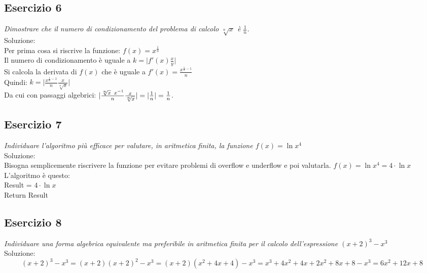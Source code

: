 \subsection{Esercizio 6}
\emph{Dimostrare che il numero di condizionamento del problema di calcolo $ \sqrt[n]{x} $ è $\frac{1}{n}$.\\}
Soluzione: \\
Per prima cosa si riscrive la funzione: $f(x) = x^{\frac{1}{n}}$\\
Il numero di condizionamento è uguale a $k = \lvert f'(x) \frac{x}{y} \rvert $\\ %
Si calcola la derivata di $ f(x) $ che è uguale a $ f'(x) = \frac{x^ { \frac{1}{n}-1 } }{n}$\\
Quindi: $ k = \lvert \frac{x^{\frac{1}{n}-1}}{n} \frac{x}{\sqrt[n]{x} }\rvert$ \\
Da cui con passaggi algebrici:
$\lvert \frac{\sqrt[n]{x} \hspace{1ex} x^{-1}}{n} \frac{x}{\sqrt[n]{x} } \rvert = \lvert \frac{1}{n} \rvert = \frac{1}{n} $.

\subsection{Esercizio 7}
\emph{Individuare l'algoritmo più efficace per valutare, in aritmetica finita, la funzione $f(x)=\ln{x^{4}}$\\}
Soluzione: \\
Bisogna semplicemente riscrivere la funzione per evitare problemi di overflow e underflow e poi valutarla.
$f(x) = \ln{x^{4}} = 4 \cdot \ln{x}$ \\
L'algoritmo è questo: \\
Result = $4 \cdot \ln{x}$ \\
Return Result\\
\subsection{Esercizio 8}
\emph{Individuare una forma algebrica equivalente ma preferibile in aritmetica finita per il calcolo dell'espressione $ (x+2)^{3} - x^{3}$\\}
Soluzione:\\
$$(x+2)^{3}-x^{3} = (x+2)(x+2)^{2} - x^{3} = (x+2)(x^{2}+4x+4)-x^{3} = x^{3} +4x^{2}+4x+2x^{2}+8x+8-x^{3} = 6x^{2} +12x+8 $$
